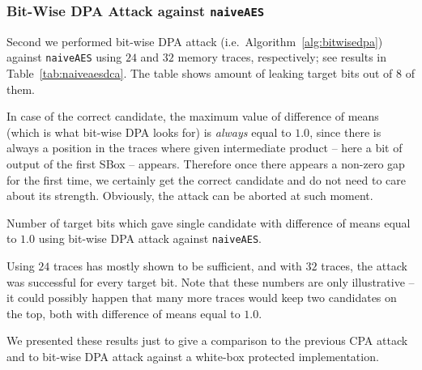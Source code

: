 \subsubsection{Bit-Wise DPA Attack against {\tt naiveAES}}
	
	Second we performed bit-wise DPA attack (i.e.\ Algorithm~\ref{alg:bitwisedpa}) against {\tt naiveAES} using $24$ and $32$ memory traces, respectively; see results in Table~\ref{tab:naiveaesdca}. The table shows amount of leaking target bits out of $8$ of them.
	
	\begin{note}
	\label{note:unprotect}
		In case of the correct candidate, the maximum value of difference of means (which is what bit-wise DPA looks for) is {\em always} equal to $1.0$, since there is always a position in the traces where given intermediate product -- here a bit of output of the first SBox -- appears. Therefore once there appears a non-zero gap for the first time, we certainly get the correct candidate and do not need to care about its strength. Obviously, the attack can be aborted at such moment.
	\end{note}
	
	\begin{table}[h]
		\begin{center}
		
		\end{center}
	\caption{Number of target bits which gave single candidate with difference of means equal to $1.0$ using bit-wise DPA attack against {\tt naiveAES}.}
	\label{tab:naiveaesdca}
	\end{table}
	
	Using $24$ traces has mostly shown to be sufficient, and with $32$ traces, the attack was successful for every target bit. Note that these numbers are only illustrative -- it could possibly happen that many more traces would keep two candidates on the top, both with difference of means equal to $1.0$.
	
	We presented these results just to give a comparison to the previous CPA attack and to bit-wise DPA attack against a white-box protected implementation.



